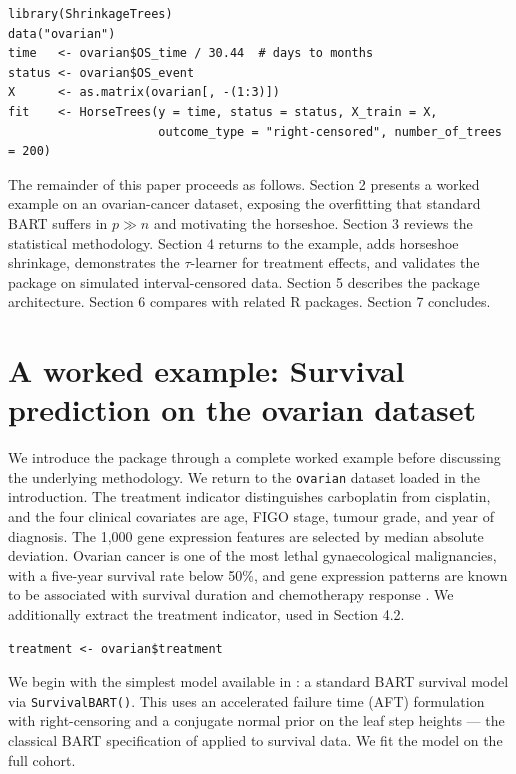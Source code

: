 \begin{verbatim}
library(ShrinkageTrees)
data("ovarian")
time   <- ovarian$OS_time / 30.44  # days to months
status <- ovarian$OS_event
X      <- as.matrix(ovarian[, -(1:3)])
fit    <- HorseTrees(y = time, status = status, X_train = X,
                     outcome_type = "right-censored", number_of_trees = 200)
\end{verbatim}

The remainder of this paper proceeds as follows. Section 2 presents a worked example on an ovarian-cancer dataset, exposing the overfitting that standard BART suffers in \(p \gg n\) and motivating the horseshoe. Section 3 reviews the statistical methodology. Section 4 returns to the example, adds horseshoe shrinkage, demonstrates the \(\tau\)-learner for treatment effects, and validates the package on simulated interval-censored data. Section 5 describes the package architecture. Section 6 compares  with related R packages. Section 7 concludes.

\section{A worked example: Survival prediction on the ovarian dataset}\label{a-worked-example-survival-prediction-on-the-ovarian-dataset}

We introduce the package through a complete worked example before discussing the underlying methodology. We return to the \texttt{ovarian} dataset loaded in the introduction. The treatment indicator distinguishes carboplatin from cisplatin, and the four clinical covariates are age, FIGO stage, tumour grade, and year of diagnosis. The 1,000 gene expression features are selected by median absolute deviation. Ovarian cancer is one of the most lethal gynaecological malignancies, with a five-year survival rate below 50\%, and gene expression patterns are known to be associated with survival duration and chemotherapy response \citep{tcga2011ovarian}. We additionally extract the treatment indicator, used in Section 4.2.

\begin{verbatim}
treatment <- ovarian$treatment
\end{verbatim}

We begin with the simplest model available in : a standard BART survival model via \texttt{SurvivalBART()}. This uses an accelerated failure time (AFT) formulation with right-censoring and a conjugate normal prior on the leaf step heights --- the classical BART specification of \citet{chipman2010bart} applied to survival data. We fit the model on the full cohort.

